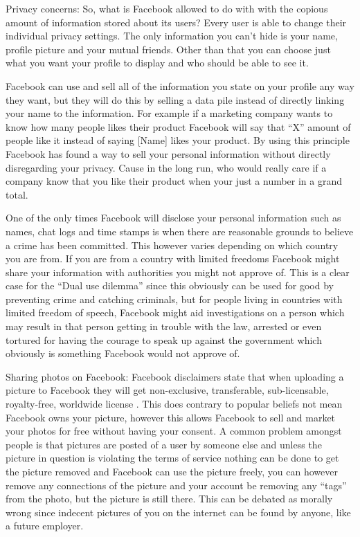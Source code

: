 \documentclass[conference]{IEEEtran}
\begin{document}
Privacy concerns:
So, what is Facebook allowed to do with with the copious amount of information stored about its users?
Every user is able to change their individual privacy settings. The only information you can’t hide is your name, profile picture and your mutual friends. Other than that you can choose just what you want your profile to display and who should be able to see it\cite{JacobClifton2011}.

Facebook can use and sell all of the information you state on your profile any way they want, but they will do this by selling a data pile instead of directly linking your name to the information\cite{JacobClifton2011}. For example if a marketing company wants to know how many people likes their product Facebook will say that “X” amount of people like it instead of saying [Name] likes your product. By using this principle Facebook has found a way to sell your personal information without directly disregarding your privacy. Cause in the long run, who would really care if a company know that you like their product when your just a number in a grand total.

One of the only times Facebook will disclose your personal information such as names, chat logs and time stamps is when there are reasonable grounds to believe a crime has been committed. This however varies depending on which country you are from. If you are from a country with limited freedoms Facebook might share your information with authorities you might not approve of. This is a clear case for the “Dual use dilemma” since this obviously can be used for good by preventing crime and catching criminals, but for people living in countries with limited freedom of speech, Facebook might aid investigations \cite{JacobClifton2011} on a person which may result in that person getting in trouble with the law, arrested or even tortured for having the courage to speak up against the government which obviously is something Facebook would not approve of.

Sharing photos on Facebook:
Facebook disclaimers state that when uploading a picture to Facebook they will get non-exclusive, transferable, sub-licensable, royalty-free, worldwide license \cite{LawOfficeDelsack}. This does contrary to popular beliefs not mean Facebook owns your picture, however this allows Facebook to sell and market your photos for free without having your consent. A common problem amongst people is that pictures are posted of a user by someone else and unless the picture in question is violating the terms of service nothing can be done to get the picture removed and Facebook can use the picture freely, you can however remove any connections of the picture and your account be removing any “tags” from the photo, but the picture is still there. This can be debated as morally wrong since indecent pictures of you on the internet can be found by anyone, like a future employer.
\end{document}
